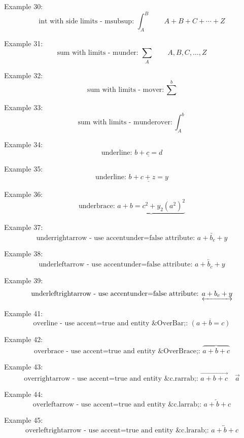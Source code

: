 \documentclass{book}
\begin{document}
\noindent Example 30:
\[
	\mbox{int with side limits - msubsup: } \int_{A}^{B}\qquad A + B + C + \cdots + Z
\]

\noindent Example 31:
\[\mbox{sum with limits - munder: } \sum_{A}\qquad A, B, C, \ldots, Z \]

\noindent Example 32:
\[\mbox{sum with limits - mover: } \sum^{b}\]

\noindent Example 33:
\[\mbox{sum with limits - munderover: } \int_{A}^{b}\]

\noindent Example 34:
\[\mbox{underline: }\underline{b+c=d}\]

\noindent Example 35:
\[\mbox{underline: }\underline{b+c+z=y}\]

\noindent Example 36:
\[\mbox{underbrace: }\underbrace{a+b=c^2 + y_2 (a^2)^2}\]

\noindent Example 37:
\[\mbox{underrightarrow - use accentunder=false attribute: }\underrightarrow{a+b_c+y}\]

\noindent Example 38:
\[\mbox{underleftarrow - use accentunder=false attribute: }\underleftarrow{a+b_c+y}\]

\noindent Example 39:
\[\mbox{underleftrightarrow - use accentunder=false attribute: }\underleftrightarrow{a+b_c+y}\]


\noindent Example 41:
\[\mbox{overline - use accent=true and entity \&OverBar;: }\overline{(a+b=c)}\]

\noindent Example 42:
\[\mbox{overbrace - use accent=true and entity \&OverBrace;: }\overbrace{a+b+c}\]

\noindent Example 43:
\[\mbox{overrightarrow - use accent=true and entity \&c.rarrab;: }\overrightarrow{a+b+c}\quad \vec{a} \]

\noindent Example 44:
\[\mbox{overleftarrow - use accent=true and entity \&c.larrab;: }\overleftarrow{a + b + c}\]

\noindent Example 45:
\[\mbox{overleftrightarrow - use accent=true and entity \&c.lrarab;: } \overleftrightarrow{a + b + c}\]

\end{document}
